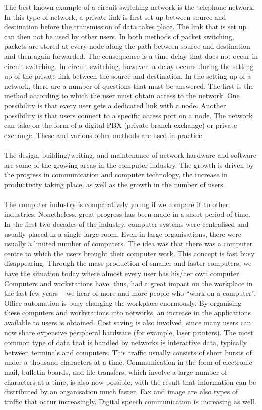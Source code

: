 \documentclass[a4paper, 12pt, titlepage]{report}
\begin{document}
The best-known example of a circuit switching network is the telephone network. In this type of network, a private link is first set up between source and destination before the transmission of data takes place. The link that is set up can then not be used by other users. In both methods of packet switching, packets are stored at every node along the path between source and destination and then again forwarded. The consequence is a time delay that does not occur in circuit switching. In circuit switching, however, a delay occurs during the setting up of the private link between the source and destination. In the setting up of a network, there are a number of questions that must be answered. The first is the method according to which the user must obtain access to the network. One possibility is that every user gets a dedicated link with a node. Another possibility is that users connect to a specific access port on a node. The network can take on the form of a digital PBX (private branch exchange) or private exchange. These and various other methods are used in practice.\\\\
The design, building/writing, and maintenance of network hardware and software are some of the growing areas in the computer industry. The growth is driven by the progress in communication and computer technology, the increase in productivity taking place, as well as the growth in the number of users.\\\\
The computer industry is comparatively young if we compare it to other industries. Nonetheless, great progress has been made in a short period of time. In the first two decades of the industry, computer systems were centralised and usually placed in a single large room. Even in large organisations, there were usually a limited number of computers. The idea was that there was a computer centre to which the users brought their computer work. This concept is fast busy disappearing. Through the mass production of smaller and faster computers, we have the situation today where almost every user has his/her own computer. Computers and workstations have, thus, had a great impact on the workplace in the last few years – we hear of more and more people who “work on a computer”. Office automation is busy changing the workplace enormously. By organising these computers and workstations into networks, an increase in the applications available to users is obtained. Cost saving is also involved, since many users can now share expensive peripheral hardware (for example, laser printers). The most common type of data that is handled by networks is interactive data, typically between terminals and computers. This traffic usually consists of short bursts of under a thousand characters at a time. Communication in the form of electronic mail, bulletin boards, and file transfers, which involve a large number of characters at a time, is also now possible, with the result that information can be distributed by an organisation much faster. Fax and image are also types of traffic that occur increasingly. Digital speech communication is increasing as well.
\end{document}
